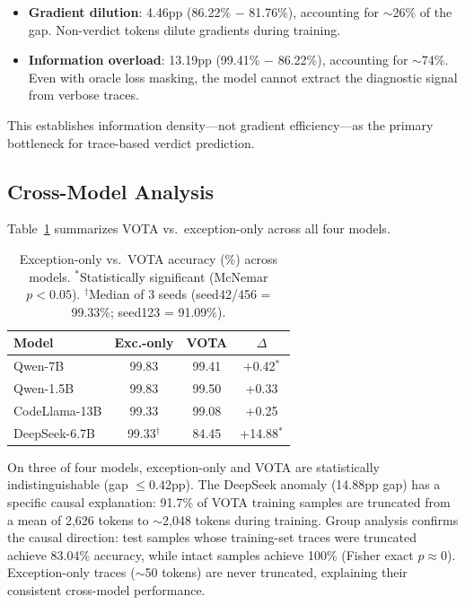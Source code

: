 \documentclass[11pt,a4paper]{article}
\begin{document}
\begin{itemize}
\item \textbf{Gradient dilution}: 4.46pp (86.22\% $-$ 81.76\%), accounting for ${\sim}$26\% of the gap. Non-verdict tokens dilute gradients during training.
\item \textbf{Information overload}: 13.19pp (99.41\% $-$ 86.22\%), accounting for ${\sim}$74\%. Even with oracle loss masking, the model cannot extract the diagnostic signal from verbose traces.
\end{itemize}

This establishes information density---not gradient efficiency---as the primary bottleneck for trace-based verdict prediction.

\subsection{Cross-Model Analysis}
\label{sec:cross-model}

Table~\ref{tab:cross-model} summarizes VOTA vs.\ exception-only across all four models.

\begin{table}[t]
\centering
\small
\begin{tabular}{lccc}
\toprule
\textbf{Model} & \textbf{Exc.-only} & \textbf{VOTA} & \textbf{$\Delta$} \\
\midrule
Qwen-7B       & 99.83 & 99.41 & +0.42$^{*}$ \\
Qwen-1.5B     & 99.83 & 99.50 & +0.33 \\
CodeLlama-13B & 99.33 & 99.08 & +0.25 \\
DeepSeek-6.7B & 99.33$^\dagger$ & 84.45 & +14.88$^{*}$ \\
\bottomrule
\end{tabular}
\caption{Exception-only vs.\ VOTA accuracy (\%) across models. $^{*}$Statistically significant (McNemar $p < 0.05$). $^\dagger$Median of 3 seeds (seed42/456 = 99.33\%; seed123 = 91.09\%).}
\label{tab:cross-model}
\end{table}

On three of four models, exception-only and VOTA are statistically indistinguishable (gap $\leq 0.42$pp).
The DeepSeek anomaly (14.88pp gap) has a specific causal explanation: 91.7\% of VOTA training samples are truncated from a mean of 2,626 tokens to ${\sim}$2,048 tokens during training.
Group analysis confirms the causal direction: test samples whose training-set traces were truncated achieve 83.04\% accuracy, while intact samples achieve 100\% (Fisher exact $p \approx 0$).
Exception-only traces (${\sim}$50 tokens) are never truncated, explaining their consistent cross-model performance.
\end{document}
